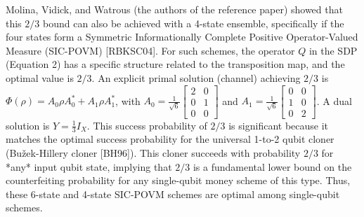 \documentclass{article} %
\begin{document}
Molina, Vidick, and Watrous (the authors of the reference paper) showed that this $2/3$ bound can also be achieved with a 4-state ensemble, specifically if the four states form a Symmetric Informationally Complete Positive Operator-Valued Measure (SIC-POVM) [RBKSC04]. For such schemes, the operator $Q$ in the SDP (Equation 2) has a specific structure related to the transposition map, and the optimal value is $2/3$.
An explicit primal solution (channel) achieving $2/3$ is $\Phi(\rho) = A_0 \rho A_0^* + A_1 \rho A_1^*$, with $A_0 = \frac{1}{\sqrt{6}}\begin{bmatrix} 2 & 0 \\ 0 & 1 \\ 0 & 0 \end{bmatrix}$ and $A_1 = \frac{1}{\sqrt{6}}\begin{bmatrix} 0 & 0 \\ 1 & 0 \\ 0 & 2 \end{bmatrix}$. A dual solution is $Y=\frac{1}{3}I_X$.
This success probability of $2/3$ is significant because it matches the optimal success probability for the universal 1-to-2 qubit cloner (Bužek-Hillery cloner [BH96]). This cloner succeeds with probability $2/3$ for *any* input qubit state, implying that $2/3$ is a fundamental lower bound on the counterfeiting probability for any single-qubit money scheme of this type. Thus, these 6-state and 4-state SIC-POVM schemes are optimal among single-qubit schemes.


\end{document}
